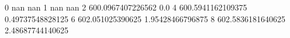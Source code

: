 0 nan nan
1 nan nan
2 600.0967407226562 0.0
4 600.5941162109375 0.49737548828125
6 602.051025390625 1.95428466796875
8 602.5836181640625 2.48687744140625
